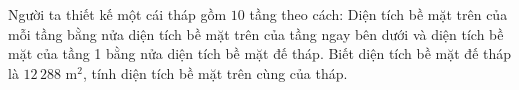 \begin{bt}%

	Người ta thiết kế một cái tháp gồm $10$ tầng theo cách: Diện tích bề mặt trên của mỗi tầng bằng nửa diện tích bề mặt trên của tầng ngay bên dưới và diện tích bề mặt của tầng 1 bằng nửa diện tích bề mặt đế tháp. Biết diện tích bề mặt đế tháp là $12\, 288$ m$^2$, tính diện tích bề mặt trên cùng của tháp.
\end{bt}

